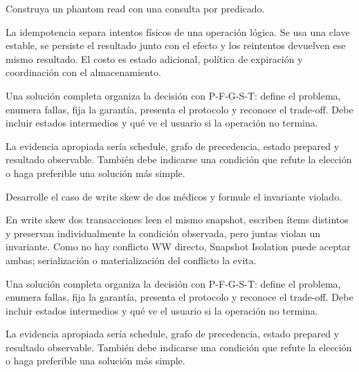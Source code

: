 \documentclass[variant=guia,cover=institutional,mode=screen]{ua-engineering-v6-article}
\begin{document}
\begin{uaexercise}
Construya un phantom read con una consulta por predicado.
\end{uaexercise}
\begin{uaanswer}
La idempotencia separa intentos físicos de una operación lógica. Se usa una clave estable, se persiste el resultado junto con el efecto y los reintentos devuelven ese mismo resultado. El costo es estado adicional, política de expiración y coordinación con el almacenamiento.

Una solución completa organiza la decisión con P-F-G-S-T: define el problema, enumera fallas, fija la garantía, presenta el protocolo y reconoce el trade-off. Debe incluir estados intermedios y qué ve el usuario si la operación no termina.

La evidencia apropiada sería schedule, grafo de precedencia, estado prepared y resultado observable. También debe indicarse una condición que refute la elección o haga preferible una solución más simple.
\end{uaanswer}

\begin{uaexercise}
Desarrolle el caso de write skew de dos médicos y formule el invariante violado.
\end{uaexercise}
\begin{uaanswer}
En write skew dos transacciones leen el mismo snapshot, escriben ítems distintos y preservan individualmente la condición observada, pero juntas violan un invariante. Como no hay conflicto WW directo, Snapshot Isolation puede aceptar ambas; serialización o materialización del conflicto la evita.

Una solución completa organiza la decisión con P-F-G-S-T: define el problema, enumera fallas, fija la garantía, presenta el protocolo y reconoce el trade-off. Debe incluir estados intermedios y qué ve el usuario si la operación no termina.

La evidencia apropiada sería schedule, grafo de precedencia, estado prepared y resultado observable. También debe indicarse una condición que refute la elección o haga preferible una solución más simple.
\end{uaanswer}
\end{document}
